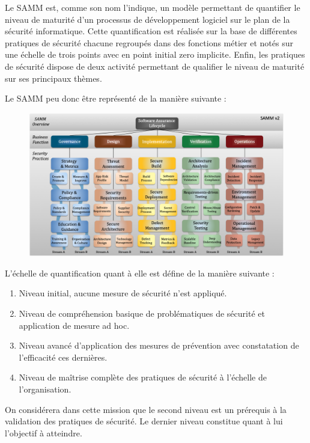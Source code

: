 Le \ac{SAMM} est, comme son nom l'indique, un modèle permettant de quantifier le niveau de maturité d'un processus de 
développement logiciel sur le plan de la sécurité informatique. Cette quantification est réalisée sur la base de différentes
pratiques de sécurité chacune regroupés dans des fonctions métier et notés sur une échelle de trois points avec en point 
initial zero implicite. Enfin, les pratiques de sécurité dispose de deux activité permettant de qualifier le niveau de 
maturité sur ses principaux thèmes.

Le \ac{SAMM} peu donc être représenté de la manière suivante :

\begin{figure}[h]
    \centering
    \includegraphics[width=1\linewidth]{resources/img/Samm_v2.png}
    \label{fig:samm-rep}
\end{figure}

\newpage

L'échelle de quantification quant à elle est défine de la manière suivante : 
\begin{enumerate}
    \item Niveau initial, aucune mesure de sécurité n'est appliqué.
    \item Niveau de compréhension basique de problématiques de sécurité et application de mesure ad hoc.
    \item Niveau avancé d'application des mesures de prévention avec constatation de l'efficacité ces dernières.
    \item Niveau de maîtrise complète des pratiques de sécurité à l'échelle de l'organisation.
\end{enumerate}
On considérera dans cette mission que le second niveau est un prérequis à la validation des pratiques de sécurité.
Le dernier niveau constitue quant à lui l'objectif à atteindre.

